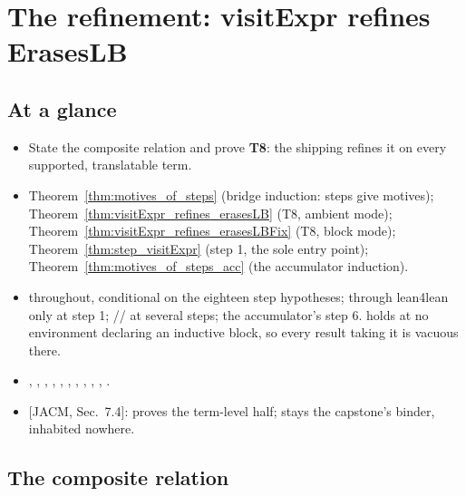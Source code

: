 \chapter{The refinement: visitExpr refines ErasesLB}
\label{chap:refinement}

\section*{At a glance}
\begin{itemize}
\item {} State the composite relation  and prove \textbf{T8}: the shipping
 refines it on every supported, translatable term.
\item {} Theorem~\ref{thm:motives_of_steps} (bridge induction: steps give motives);
Theorem~\ref{thm:visitExpr_refines_erasesLB} (T8, ambient mode);
Theorem~\ref{thm:visitExpr_refines_erasesLBFix} (T8, block mode); Theorem~\ref{thm:step_visitExpr}
(step 1, the sole  entry point); Theorem~\ref{thm:motives_of_steps_acc} (the
accumulator induction).
\item {} \stProved{} throughout, conditional on the eighteen step hypotheses; \stInherited{}
through lean4lean only at step 1; \stAssumed{} // at
several steps; \stOpen{} the accumulator's step 6.  holds at no environment declaring
an inductive block, so every result taking it is vacuous there.
\item {} , , ,
, ,
, ,
, ,
, .
\item {} [JACM, Sec.~7.4]: proves the term-level half;  stays the
capstone's  binder, inhabited nowhere.
\end{itemize}

\section{The composite relation}
\label{sec:refinement:composite}

